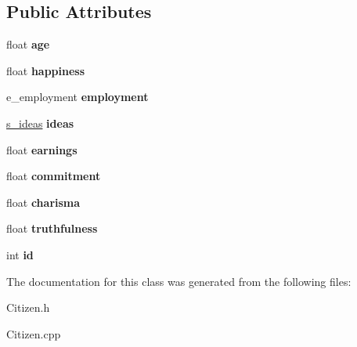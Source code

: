 \subsection*{Public Attributes}
\begin{DoxyCompactItemize}
\item 
\hypertarget{classCitizen_af59a2f517291f28c0f86c569770d2ed8}{float {\bfseries age}}\label{classCitizen_af59a2f517291f28c0f86c569770d2ed8}

\item 
\hypertarget{classCitizen_a8cb2492be0ca7360d72d76948853ed60}{float {\bfseries happiness}}\label{classCitizen_a8cb2492be0ca7360d72d76948853ed60}

\item 
\hypertarget{classCitizen_a6eede2e2638a5e0e4b6a071492d59023}{e\+\_\+employment {\bfseries employment}}\label{classCitizen_a6eede2e2638a5e0e4b6a071492d59023}

\item 
\hypertarget{classCitizen_ac0727fb6ab762125958c81d1fb615671}{\hyperlink{structs__ideas}{s\+\_\+ideas} {\bfseries ideas}}\label{classCitizen_ac0727fb6ab762125958c81d1fb615671}

\item 
\hypertarget{classCitizen_a7df6a9a2dd69a92a92de16eaa5e933e9}{float {\bfseries earnings}}\label{classCitizen_a7df6a9a2dd69a92a92de16eaa5e933e9}

\item 
\hypertarget{classCitizen_a0ff5d3a1b560a6564b782f93b16ed24a}{float {\bfseries commitment}}\label{classCitizen_a0ff5d3a1b560a6564b782f93b16ed24a}

\item 
\hypertarget{classCitizen_a47e3e2fe352666e6b1d6182fc918188a}{float {\bfseries charisma}}\label{classCitizen_a47e3e2fe352666e6b1d6182fc918188a}

\item 
\hypertarget{classCitizen_aba65cc18df9e1e970eb3ec146a524858}{float {\bfseries truthfulness}}\label{classCitizen_aba65cc18df9e1e970eb3ec146a524858}

\item 
\hypertarget{classCitizen_a1217745e0ab4398bd700db2f3fc627b8}{int {\bfseries id}}\label{classCitizen_a1217745e0ab4398bd700db2f3fc627b8}

\end{DoxyCompactItemize}


The documentation for this class was generated from the following files\+:\begin{DoxyCompactItemize}
\item 
Citizen.\+h\item 
Citizen.\+cpp\end{DoxyCompactItemize}
